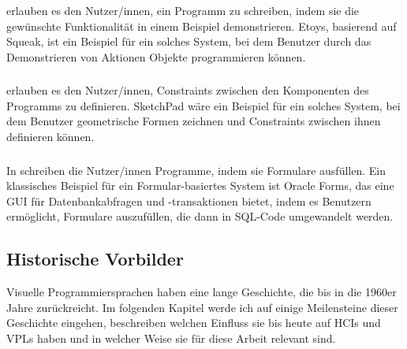 \documentclass[ngerman]{article}
\begin{document}
\subsubsection{}
 erlauben es den Nutzer/innen, ein Programm zu schreiben, indem sie die gewünschte Funktionalität in einem Beispiel demonstrieren. Etoys, basierend auf Squeak, ist ein Beispiel für ein solches System, bei dem Benutzer durch das Demonstrieren von Aktionen Objekte programmieren können. \cite{squeakSqueakSmalltalk}

\subsubsection{}
 erlauben es den Nutzer/innen, Constraints zwischen den Komponenten des Programms zu definieren. SketchPad wäre ein Beispiel für ein solches System, bei dem Benutzer geometrische Formen zeichnen und Constraints zwischen ihnen definieren können. \cite{sutherlandSketchpad}

\subsubsection{}
In  schreiben die Nutzer/innen Programme, indem sie Formulare ausfüllen. 
Ein klassisches Beispiel für ein Formular-basiertes System ist Oracle Forms, 
das eine GUI für Datenbankabfragen und -transaktionen bietet, indem es Benutzern ermöglicht, Formulare auszufüllen, die dann in SQL-Code umgewandelt werden. \cite{wikipediaOracleForms}

\subsection{Historische Vorbilder}

Visuelle Programmiersprachen haben eine lange Geschichte, die bis in die 1960er Jahre zurückreicht. Im folgenden Kapitel werde ich auf einige Meilensteine dieser Geschichte eingehen, beschreiben welchen Einfluss sie bis heute auf HCIs und VPLs haben und in welcher Weise sie für diese Arbeit relevant sind.
\end{document}
